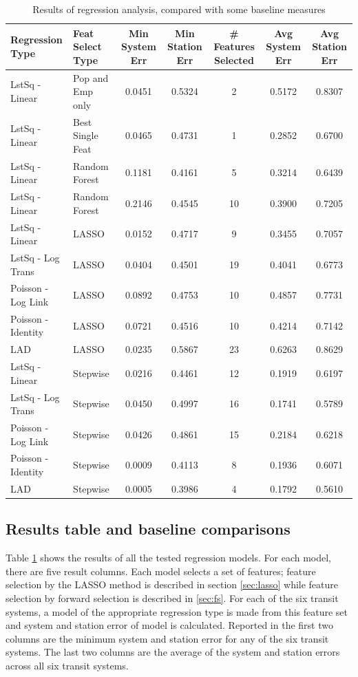 \documentclass[11pt]{article}
\begin{document}
\begin{table}[H]
\begingroup\fontsize{8}{15}\selectfont
\centering
\begin{tabular}{ll|ccccc}
\toprule
Regression Type&Feat Select Type& Min System Err&Min Station Err& \# Features Selected& Avg System Err& Avg Station Err\\
\midrule
LstSq - Linear&Pop and Emp only&0.0451&0.5324&2&0.5172&0.8307\\
LstSq - Linear&Best Single Feat&0.0465&0.4731&1&0.2852&0.6700\\
LstSq - Linear&Random Forest&0.1181&0.4161&5&0.3214&0.6439\\
LstSq - Linear&Random Forest&0.2146&0.4545&10&0.3900&0.7205\\
\midrule
LstSq - Linear&LASSO&0.0152&0.4717&9&0.3455&0.7057\\
LstSq - Log Trans&LASSO&0.0404&0.4501&19&0.4041&0.6773\\
Poisson - Log Link&LASSO&0.0892&0.4753&10&0.4857&0.7731\\
Poisson - Identity&LASSO&0.0721&0.4516&10&0.4214&0.7142\\
LAD&LASSO&0.0235&0.5867&23&0.6263&0.8629\\
\midrule
LstSq - Linear&Stepwise&0.0216&0.4461&12&0.1919&0.6197\\
LstSq - Log Trans&Stepwise&0.0450&0.4997&16&0.1741&0.5789\\
Poisson - Log Link&Stepwise&0.0426&0.4861&15&0.2184&0.6218\\
Poisson - Identity&Stepwise&0.0009&0.4113&8&0.1936&0.6071\\
LAD&Stepwise&0.0005&0.3986&4&0.1792&0.5610\\
\end{tabular}
\caption{Results of regression analysis, compared with some baseline measures}\label{tab:rresults}
\endgroup
\end{table}

\subsection{Results table and baseline comparisons}

Table \ref{tab:rresults} shows the results of all the tested regression models. For each model, there are five result columns. Each model selects a set of features; feature selection by the LASSO method is described in section \ref{sec:lasso} while feature selection by forward selection is described in \ref{sec:fs}. For each of the six transit systems, a model of the appropriate regression type is made from this feature set and system and station error of model is calculated. Reported in the first two columns are the minimum system and station error for any of the six transit systems. The last two columns are the average of the system and station errors across all six transit systems. 
\end{document}
